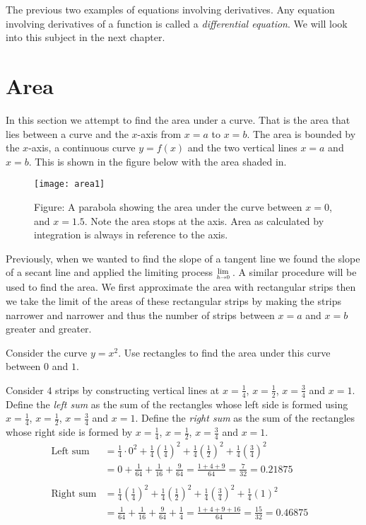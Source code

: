 The previous two examples of equations involving derivatives. Any equation involving derivatives of a function is called a \emph{differential equation}. We will look into this subject in the next chapter. 

 
\section{Area}
In this section we attempt to find the area under a curve. That is the area that lies between a curve
and the $x$-axis from $x =a$ to $x =b$. The area is bounded by the $x$-axis, a continuous curve $y =f (x)$ and the two vertical lines $x =a$ and $x =b$. This is shown in the figure below with the area shaded in.
\clearpage
\begin{SCfigure}[1][h]
	\texttt{[image: area1]}
	\caption*{Figure: A parabola showing the area under the curve between $x=0$, and $x=1.5$. Note the area stops at the axis. Area as calculated by integration is always in reference to the axis.}
\end{SCfigure}

Previously, when we wanted to find the slope of a tangent line we found the slope of a secant line and applied the limiting process $\Lim{h\to 0}$. A similar procedure will be used to find the area. We first approximate the area with rectangular strips then we take the limit of the areas of these rectangular strips by making the strips narrower and narrower and thus the number of strips between $x =a$ and $x =b$ greater and greater. 

\example Consider the curve $y =x^{2}$. Use rectangles to find the area under this curve between $0$ and $1$. 

\solution Consider $4$ strips by constructing vertical lines at $x =\frac{1}{4}$, $x =\frac{1}{2}$, $x =\frac{3}{4}$ and $x =1$. Define the \emph{left sum} as the sum of the rectangles whose
left side is formed using $x =\frac{1}{4}$, $x =\frac{1}{2}$, $x =\frac{3}{4}$ and $x =1$. Define the \emph{right sum} as the sum of the rectangles whose
right side is formed by $x =\frac{1}{4}$, $x =\frac{1}{2}$, $x =\frac{3}{4}$ and $x =1$.
\begin{align*}\text{Left sum} &  = \frac{1}{4} \cdot 0^{2} +\frac{1}{4} \genfrac{(}{)}{}{}{1}{4}^{2} +\frac{1}{4} \genfrac{(}{)}{}{}{1}{2}^{2} +\frac{1}{4} \genfrac{(}{)}{}{}{3}{4}^{2} \\
 &  = 0 +\frac{1}{64} +\frac{1}{16} +\frac{9}{64} =\frac{1 +4 +9}{64} =\frac{7}{32} =0.21875 \\
\, &  &  \\
\text{Right sum} &  = \frac{1}{4} \genfrac{(}{)}{}{}{1}{4}^{2} +\frac{1}{4} \genfrac{(}{)}{}{}{1}{2}^{2} +\frac{1}{4} \genfrac{(}{)}{}{}{3}{4}^{2} +\frac{1}{4} \left (1\right )^{2} \\
 &  = \frac{1}{64} +\frac{1}{16} +\frac{9}{64} +\frac{1}{4} =\frac{1 +4 +9 +16}{64} =\frac{15}{32} =0.46875\end{align*}

